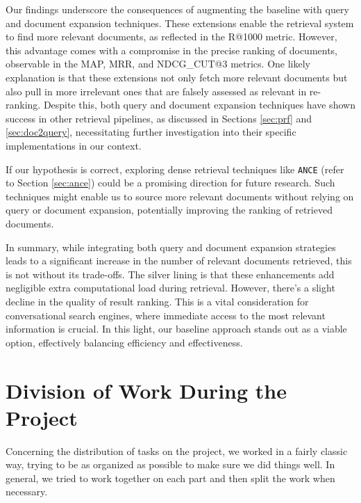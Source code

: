 \documentclass[sigconf]{acmart}
\begin{document}
Our findings underscore the consequences of augmenting the baseline with query and document expansion techniques. These extensions enable the retrieval system to find more relevant documents, as reflected in the R@1000 metric. However, this advantage comes with a compromise in the precise ranking of documents, observable in the MAP, MRR, and NDCG\_CUT@3 metrics. One likely explanation is that these extensions not only fetch more relevant documents but also pull in more irrelevant ones that are falsely assessed as relevant in re-ranking. Despite this, both query and document expansion techniques have shown success in other retrieval pipelines, as discussed in Sections \ref{sec:prf} and \ref{sec:doc2query}, necessitating further investigation into their specific implementations in our context.

If our hypothesis is correct, exploring dense retrieval techniques like \texttt{ANCE} (refer to Section \ref{sec:ance}) could be a promising direction for future research. Such techniques might enable us to source more relevant documents without relying on query or document expansion, potentially improving the ranking of retrieved documents.

In summary, while integrating both query and document expansion strategies leads to a significant increase in the number of relevant documents retrieved, this is not without its trade-offs. The silver lining is that these enhancements add negligible extra computational load during retrieval. However, there's a slight decline in the quality of result ranking. This is a vital consideration for conversational search engines, where immediate access to the most relevant information is crucial. In this light, our baseline approach stands out as a viable option, effectively balancing efficiency and effectiveness.








\newpage
\appendix
\section{Division of Work During the Project}
Concerning the distribution of tasks on the project, we worked in a fairly classic way, trying to be as organized as possible to make sure we did things well. In general, we tried to work together on each part and then split the work when necessary.
\end{document}
